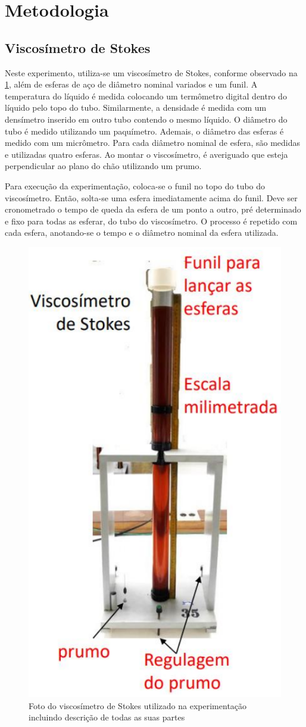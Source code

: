 \section{Metodologia}

\subsection{Viscosímetro de Stokes}
    Neste experimento, utiliza-se um viscosímetro de Stokes, conforme observado na \cref{viscosimetro.png}, além de esferas de aço de diâmetro nominal variados e um funil. A temperatura do líquido é medida colocando um termômetro digital dentro do líquido pelo topo do tubo. Similarmente, a densidade é medida com um densímetro inserido em outro tubo contendo o mesmo líquido. O diâmetro do tubo é medido utilizando um paquímetro. Ademais, o diâmetro das esferas é medido com um micrômetro. Para cada diâmetro nominal de esfera, são medidas e utilizadas quatro esferas. Ao montar o viscosímetro, é averiguado que esteja perpendicular ao plano do chão utilizando um prumo. 
    
    Para execução da experimentação, coloca-se o funil no topo do tubo do viscosímetro. Então, solta-se uma esfera imediatamente acima do funil. Deve ser cronometrado o tempo de queda da esfera de um ponto a outro, pré determinado e fixo para todas as esferar, do tubo do viscosímetro. O processo é repetido com cada esfera, anotando-se o tempo e o diâmetro nominal da esfera utilizada.  

    \begin{figure}[H]
        \centering
        \includegraphics[width=0.3\linewidth]{fig/viscosimetro.png}
        \caption{Foto do viscosímetro de Stokes utilizado na experimentação incluindo descrição de todas as suas partes}
        \label{viscosimetro.png}
    \end{figure}

